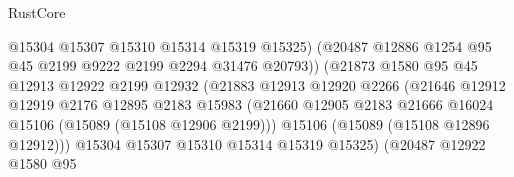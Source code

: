 \begin{lexlean}{RustCore}
\begin{coremodule}
                                        @15304
                                        @15307
                                        @15310
                                        @15314
                                        @15319
                                        @15325)
                                      (@20487
                                        @12886
                                        @1254
                                        @95
                                        @45
                                        @2199
                                        @9222
                                        @2199
                                        @2294
                                        @31476
                                        @20793))
                                    (@21873
                                      @1580
                                      @95
                                      @45
                                      @12913
                                      @12922
                                      @2199
                                      @12932
                                      (@21883
                                        @12913
                                        @12920
                                        @2266
                                        (@21646
                                          @12912
                                          @12919
                                          @2176
                                          @12895
                                          @2183
                                          @15983
                                          (@21660
                                            @12905
                                            @2183
                                            @21666
                                            @16024
                                            @15106
                                            (@15089 (@15108 @12906 @2199)))
                                          @15106
                                          (@15089 (@15108 @12896 @12912)))
                                        @15304
                                        @15307
                                        @15310
                                        @15314
                                        @15319
                                        @15325)
                                      (@20487
                                        @12922
                                        @1580
                                        @95

\end{coremodule}
\end{lexlean}
